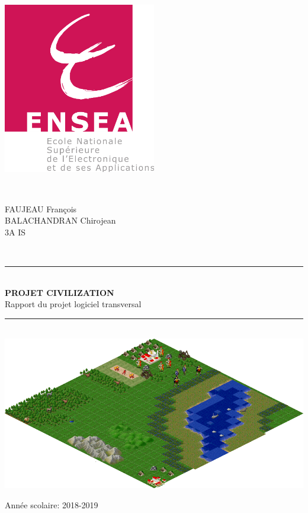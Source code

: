 \documentclass[12pt,a4paper]{article}
\begin{document}
\begin{titlepage}

\newcommand{\HRule}{\rule{\linewidth}{0.5mm}} %

\begin{minipage}{0.4\textwidth}
\begin{flushleft} \large
\includegraphics[width=0.5\textwidth]{Logo_ENSEA.jpg} 
\end{flushleft}
\end{minipage}
~
\begin{minipage}{0.57\textwidth}
\begin{flushright} \large
FAUJEAU François \textsc{} \\
BALACHANDRAN Chirojean\textsc{} \\
3A IS\textsc{} \\
\end{flushright}
\end{minipage}\\[1cm]

\centering

\HRule \\[0.5cm]
{ \huge \bfseries PROJET CIVILIZATION}\\[0.3cm]%
Rapport du projet logiciel transversal \textsc{} \\[0.5cm]
\HRule \\[3cm]

\includegraphics[width=1\textwidth]{ressources/map.png}\\[3.5cm]


\begin{flushleft}
Année scolaire: 2018-2019
\end{flushleft}
\end{titlepage}
\end{document}
